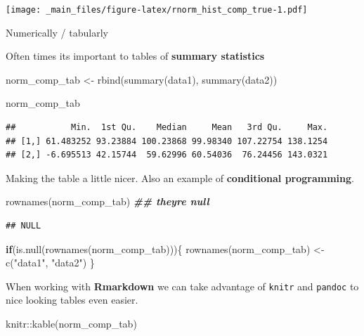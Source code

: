 \documentclass[
]{book}
\newenvironment{Shaded}{\begin{snugshade}}{\end{snugshade}}
\newcommand{\ControlFlowTok}[1]{\textcolor[rgb]{0.13,0.29,0.53}{\textbf{#1}}}
\newcommand{\DocumentationTok}[1]{\textcolor[rgb]{0.56,0.35,0.01}{\textbf{\textit{#1}}}}
\newcommand{\FunctionTok}[1]{\textcolor[rgb]{0.00,0.00,0.00}{#1}}
\newcommand{\NormalTok}[1]{#1}
\newcommand{\OtherTok}[1]{\textcolor[rgb]{0.56,0.35,0.01}{#1}}
\newcommand{\SpecialCharTok}[1]{\textcolor[rgb]{0.00,0.00,0.00}{#1}}
\newcommand{\StringTok}[1]{\textcolor[rgb]{0.31,0.60,0.02}{#1}}
\begin{document}
\texttt{[image: \_main\_files/figure-latex/rnorm\_hist\_comp\_true-1.pdf]}

Numerically / tabularly

Often times its important to tables of \textbf{summary statistics}

\begin{Shaded}
\begin{Highlighting}[]
\NormalTok{norm\_comp\_tab }\OtherTok{\textless{}{-}} \FunctionTok{rbind}\NormalTok{(}\FunctionTok{summary}\NormalTok{(data1),}
                       \FunctionTok{summary}\NormalTok{(data2))}

\NormalTok{norm\_comp\_tab}
\end{Highlighting}
\end{Shaded}

\begin{verbatim}
##           Min.  1st Qu.    Median     Mean   3rd Qu.     Max.
## [1,] 61.483252 93.23884 100.23868 99.98340 107.22754 138.1254
## [2,] -6.695513 42.15744  59.62996 60.54036  76.24456 143.0321
\end{verbatim}

Making the table a little nicer. Also an example of \textbf{conditional programming}.

\begin{Shaded}
\begin{Highlighting}[]
\FunctionTok{rownames}\NormalTok{(norm\_comp\_tab) }\DocumentationTok{\#\# they\textquotesingle{}re null}
\end{Highlighting}
\end{Shaded}

\begin{verbatim}
## NULL
\end{verbatim}

\begin{Shaded}
\begin{Highlighting}[]
\ControlFlowTok{if}\NormalTok{(}\FunctionTok{is.null}\NormalTok{(}\FunctionTok{rownames}\NormalTok{(norm\_comp\_tab)))\{}
  \FunctionTok{rownames}\NormalTok{(norm\_comp\_tab) }\OtherTok{\textless{}{-}} \FunctionTok{c}\NormalTok{(}\StringTok{"data1"}\NormalTok{, }\StringTok{"data2"}\NormalTok{)}
\NormalTok{\}}
\end{Highlighting}
\end{Shaded}

When working with \textbf{Rmarkdown} we can take advantage of \texttt{knitr} and \texttt{pandoc} to nice looking tables even easier.

\begin{Shaded}
\begin{Highlighting}[]
\NormalTok{knitr}\SpecialCharTok{::}\FunctionTok{kable}\NormalTok{(norm\_comp\_tab)}
\end{Highlighting}
\end{Shaded}
\end{document}
